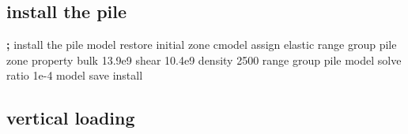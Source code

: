 \documentclass[a4paper, nobind]{templates/ociamthesis}
\newenvironment{Shaded}{\begin{snugshade}}{\end{snugshade}}
\newcommand{\BuiltInTok}[1]{#1}
\newcommand{\DecValTok}[1]{\textcolor[rgb]{0.00,0.00,0.81}{#1}}
\newcommand{\FloatTok}[1]{\textcolor[rgb]{0.00,0.00,0.81}{#1}}
\newcommand{\NormalTok}[1]{#1}
\newcommand{\OperatorTok}[1]{\textcolor[rgb]{0.81,0.36,0.00}{\textbf{#1}}}
\newcommand{\StringTok}[1]{\textcolor[rgb]{0.31,0.60,0.02}{#1}}
\renewenvironment{Shaded}
{
  \vspace{10pt}%
  \begin{snugshade}%
}{%
  \end{snugshade}%
  \vspace{8pt}%
}
\begin{document}
\hypertarget{install-the-pile}{%
\subsection{install the pile}\label{install-the-pile}}

\begin{Shaded}
\begin{Highlighting}[]
\OperatorTok{;}\NormalTok{ install the pile}
\NormalTok{model restore }\StringTok{\textquotesingle{}initial\textquotesingle{}}
\NormalTok{zone cmodel assign elastic                          }\BuiltInTok{range}\NormalTok{ group }\StringTok{\textquotesingle{}pile\textquotesingle{}}
\NormalTok{zone }\BuiltInTok{property}\NormalTok{ bulk }\FloatTok{13.9e9}\NormalTok{ shear }\FloatTok{10.4e9}\NormalTok{ density }\DecValTok{2500} \BuiltInTok{range}\NormalTok{ group }\StringTok{\textquotesingle{}pile\textquotesingle{}}
\NormalTok{model solve ratio }\FloatTok{1e{-}4}
\NormalTok{model save }\StringTok{\textquotesingle{}install\textquotesingle{}}
\end{Highlighting}
\end{Shaded}

\hypertarget{vertical-loading}{%
\subsection{vertical loading}\label{vertical-loading}}
\end{document}
